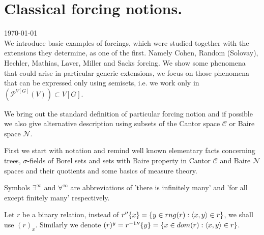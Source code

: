 \cfoot{}\rhead{\thepage}

%


\thispagestyle{empty}

\section{Classical forcing notions.}

{\tiny \today } \\[0.5cm]

We introduce basic examples of forcings, which were studied
together with the extensions they determine,
as one of the first. Namely Cohen, Random (Solovay), Hechler, Mathias,
Laver, Miller and Sacks forcing. We show some phenomena that
could arise in particular generic extensions, we focus
on those phenomena that can be expressed only using
semisets, i.e. we work only in $(\mathcal P^{V[G]} (V)) \subset V[G]$.

We bring out the standard definition of particular forcing notion
and if possible we also give alternative description using
subsets of the Cantor space $\mathcal C$ or Baire space $\mathcal N$.

First we start with notation and remind well known elementary facts
concerning trees, $\sigma$-fields of Borel sets and sets with
Baire property in Cantor $\mathcal C$ and Baire $\mathcal N$ spaces
and their quotients and some basics of measure theory.

\begin{notation}
Symbols $\exists^\infty$ and $\forall^\infty$ are abbreviations
of 'there is infinitely many' and 'for all except finitely many'
respectively.

\medskip

 Let $r$ be a binary relation, instead of $r''\{x\} = \{ y \in rng(r) : \langle x , y \rangle \in r \}$,
 we shall use $(r)_x$. Similarly we denote
 $(r)^y = r^{-1}{}''\{y\} = \{x \in dom(r) : \langle x , y \rangle \in r \}$.
\end{notation}


